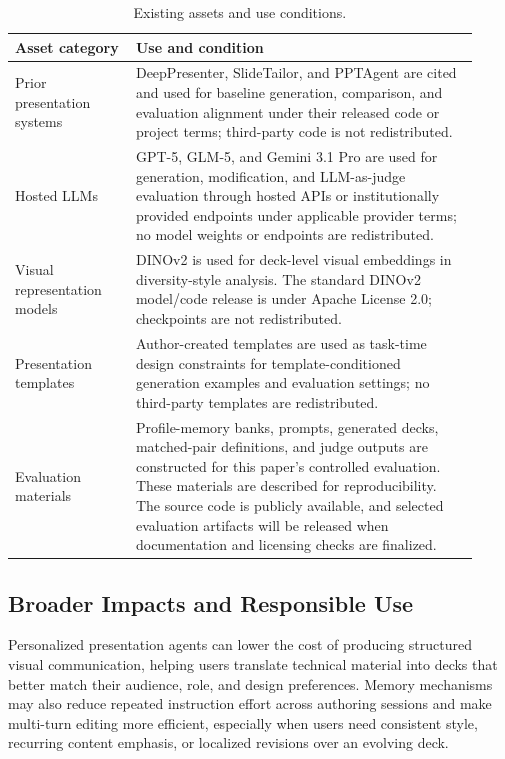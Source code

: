 \begin{table}[!htbp]
\centering
\small
\caption{Existing assets and use conditions.}
\label{tab:existing_assets}
\setlength{\tabcolsep}{5pt}
\begin{tabular}{p{0.24\linewidth}p{0.68\linewidth}}
\toprule
Asset category & Use and condition \\
\midrule
Prior presentation systems &
DeepPresenter, SlideTailor, and PPTAgent are cited and used for baseline
generation, comparison, and evaluation alignment under their released code or
project terms; third-party code is not redistributed. \\
\midrule
Hosted LLMs &
GPT-5, GLM-5, and Gemini 3.1 Pro are used for generation, modification, and
LLM-as-judge evaluation through hosted APIs or institutionally provided endpoints under
applicable provider terms; no model weights or endpoints are redistributed. \\
\midrule
Visual representation models &
DINOv2 is used for deck-level visual embeddings in diversity-style analysis.
The standard DINOv2 model/code release is under Apache License 2.0; checkpoints
are not redistributed. \\
\midrule
Presentation templates &
Author-created templates are used as task-time design constraints for
template-conditioned generation examples and evaluation settings; no
third-party templates are redistributed. \\
\midrule
Evaluation materials &
Profile-memory banks, prompts, generated decks, matched-pair definitions, and
judge outputs are constructed for this paper's controlled evaluation. These
materials are described for reproducibility. The source code is publicly
available, and selected evaluation artifacts will be released when
documentation and licensing checks are finalized. \\
\bottomrule
\end{tabular}
\end{table}

\subsection{Broader Impacts and Responsible Use}

Personalized presentation agents can lower the cost of producing structured
visual communication, helping users translate technical material into decks
that better match their audience, role, and design preferences. Memory
mechanisms may also reduce repeated instruction effort across authoring
sessions and make multi-turn editing more efficient, especially when users
need consistent style, recurring content emphasis, or localized revisions over
an evolving deck.

